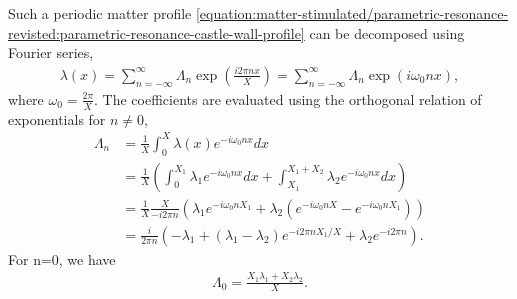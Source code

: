 \documentclass[letterpaper,12pt,english]{sphinxmanual}
\begin{document}
Such a periodic matter profile \eqref{equation:matter-stimulated/parametric-resonance-revisted:parametric-resonance-castle-wall-profile} can be decomposed using Fourier series,
\begin{equation*}
\begin{split}\lambda(x) = \sum_{n=-\infty}^{\infty} \Lambda_n \exp\left( \frac{i2\pi n x}{X} \right) = \sum_{n=-\infty}^{\infty} \Lambda_n \exp\left( i \omega_0 n x \right),\end{split}
\end{equation*}
where \(\omega_0 = \frac{2\pi}{X}\). The coefficients are evaluated using the orthogonal relation of exponentials for \(n\neq 0\),
\label{\detokenize{matter-stimulated/parametric-resonance-revisted:equation-parametric-resonance-castle-wall-fourier-coeff}}\begin{equation}\label{equation:matter-stimulated/parametric-resonance-revisted:parametric-resonance-castle-wall-fourier-coeff}
\begin{split}\Lambda_n &= \frac{1}{X} \int_0^X \lambda(x) e^{ - i \omega_0 n x} dx \\
& = \frac{1}{X} \left( \int_{0}^{X_1} \lambda_1 e^{ - i \omega_0 n x} dx + \int_{X_1}^{X_1+X_2} \lambda_2 e^{ - i \omega_0 n x} dx  \right) \\
& = \frac{1}{X} \frac{X}{-i2\pi n} \left( \lambda_1 e^{-i\omega_0 n X_1} + \lambda_2 \left( e^{-i\omega_0 n X} - e^{-i\omega_0 n X_1}  \right) \right) \\
& = \frac{i}{2\pi n} \left( -\lambda_1 + (\lambda_1 - \lambda_2) e^{-i2\pi n X_1/X} + \lambda_2 e^{-i 2\pi n} \right).\end{split}
\end{equation}
For n=0, we have
\begin{equation*}
\begin{split}\Lambda_0 = \frac{X_1 \lambda_1 + X_2 \lambda_2}{X}.\end{split}
\end{equation*}
\end{document}
